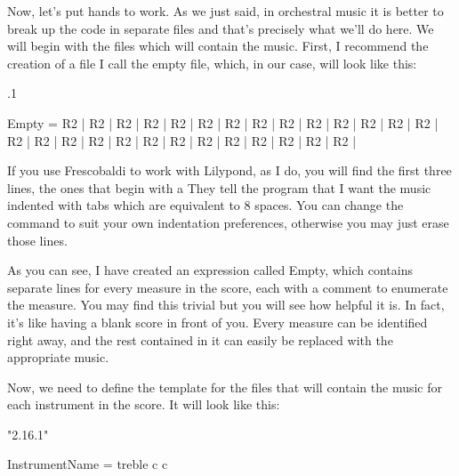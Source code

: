 \documentclass[../../LilyPond-Tutorials]{subfiles}
\begin{document}
Now, let's put hands to work.
As we just said, in orchestral music it is better to break up the code in separate files and that's precisely what we'll do here.
We will begin with the files which will contain the music.
First, I recommend the creation of a file I call the empty file, which, in our case, will look like this:

\begin{lilypondcode}
.1 %



Empty = {
        R2 | %
        R2 | %
        R2 | %
        R2 | %
        R2 | %
        R2 | %
        R2 | %
        R2 | %
        R2 | %
        R2 | %
        R2 | %
        R2 | %
        R2 | %
        R2 | %
        R2 | %
        R2 | %
        R2 | %
        R2 | %
        R2 | %
        R2 | %
        R2 | %
        R2 | %
        R2 | %
        R2 | %
        R2 | %
        R2 | %
        R2 | %
}
\end{lilypondcode}


If you use Frescobaldi to work with Lilypond, as I do, you will find the first three lines, the ones that begin with a %
They tell the program that I want the music indented with tabs which are equivalent to 8 spaces.
You can change the command to suit your own indentation preferences, otherwise you may just erase those lines.

As you can see, I have created an expression called Empty, which contains separate lines for every measure in the score, each with a comment to enumerate the measure. 
You may find this trivial but you will see how helpful it is.
In fact, it's like having a blank score in front of you.
Every measure can be identified right away, and the rest contained in it can easily be replaced with the appropriate music.

Now, we need to define the template for the files that will contain the music for each instrument in the score.
It will look like this:

\begin{lilypondcode}
\version "2.16.1"


InstrumentName = {
       \clef treble %
       \key c \major
       \relative c {
              \PersonalSettings
       }
}
\end{lilypondcode}
\end{document}
